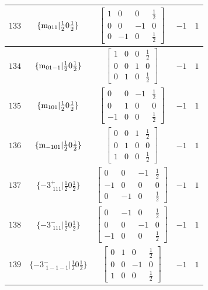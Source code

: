 \documentclass[fleqn,8pt]{jsarticle}
\begin{document}
\begin{longtable}{ccccc}
$ 133 $ & $ \{{\rm m}_{011}|\frac{1}{2} 0 \frac{1}{2}\} $ & $ \begin{bmatrix} 1 & 0 & 0 & \frac{1}{2} \\ 0 & 0 & -1 & 0 \\ 0 & -1 & 0 & \frac{1}{2} \end{bmatrix} $ & $ -1 $ & $ 1 $ \\ \hline
$ 134 $ & $ \{{\rm m}_{01-1}|\frac{1}{2} 0 \frac{1}{2}\} $ & $ \begin{bmatrix} 1 & 0 & 0 & \frac{1}{2} \\ 0 & 0 & 1 & 0 \\ 0 & 1 & 0 & \frac{1}{2} \end{bmatrix} $ & $ -1 $ & $ 1 $ \\ \hline
$ 135 $ & $ \{{\rm m}_{101}|\frac{1}{2} 0 \frac{1}{2}\} $ & $ \begin{bmatrix} 0 & 0 & -1 & \frac{1}{2} \\ 0 & 1 & 0 & 0 \\ -1 & 0 & 0 & \frac{1}{2} \end{bmatrix} $ & $ -1 $ & $ 1 $ \\ \hline
$ 136 $ & $ \{{\rm m}_{-101}|\frac{1}{2} 0 \frac{1}{2}\} $ & $ \begin{bmatrix} 0 & 0 & 1 & \frac{1}{2} \\ 0 & 1 & 0 & 0 \\ 1 & 0 & 0 & \frac{1}{2} \end{bmatrix} $ & $ -1 $ & $ 1 $ \\ \hline
$ 137 $ & $ \{-3^{+}_{\,\,111}|\frac{1}{2} 0 \frac{1}{2}\} $ & $ \begin{bmatrix} 0 & 0 & -1 & \frac{1}{2} \\ -1 & 0 & 0 & 0 \\ 0 & -1 & 0 & \frac{1}{2} \end{bmatrix} $ & $ -1 $ & $ 1 $ \\ \hline
$ 138 $ & $ \{-3^{-}_{\,\,111}|\frac{1}{2} 0 \frac{1}{2}\} $ & $ \begin{bmatrix} 0 & -1 & 0 & \frac{1}{2} \\ 0 & 0 & -1 & 0 \\ -1 & 0 & 0 & \frac{1}{2} \end{bmatrix} $ & $ -1 $ & $ 1 $ \\ \hline
$ 139 $ & $ \{-3^{-}_{\,\,1-1-1}|\frac{1}{2} 0 \frac{1}{2}\} $ & $ \begin{bmatrix} 0 & 1 & 0 & \frac{1}{2} \\ 0 & 0 & -1 & 0 \\ 1 & 0 & 0 & \frac{1}{2} \end{bmatrix} $ & $ -1 $ & $ 1 $ \\ \hline

\end{longtable}
\end{document}
